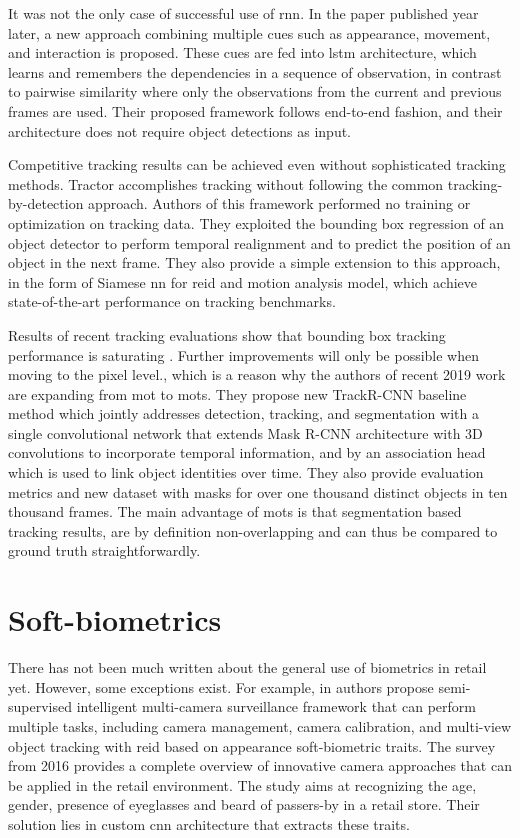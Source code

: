     It was not the only case of successful use of \gls{rnn}. In the paper \cite{sadeghian2017tracking} published year later, a new approach combining multiple cues such as appearance, movement, and interaction is proposed. These cues are fed into \gls{lstm} architecture, which learns and remembers the dependencies in a sequence of observation, in contrast to pairwise similarity where only the observations from the current and previous frames are used. Their proposed framework follows end-to-end fashion, and their architecture does not require object detections as input.
    
    Competitive tracking results can be achieved even without sophisticated tracking methods. Tractor \cite{DBLP:journals/corr/abs-1903-05625} accomplishes tracking without following the common tracking-by-detection approach. Authors of this framework performed no training or optimization on tracking data. They exploited the bounding box regression of an object detector to perform temporal realignment and to predict the position of an object in the next frame. They also provide a simple extension to this approach, in the form of Siamese \gls{nn} for \gls{reid} and motion analysis model, which achieve state-of-the-art performance on tracking benchmarks. 
    
    Results of recent tracking evaluations show that bounding box tracking performance is saturating \cite{mot16}. Further improvements will only be possible when moving to the pixel level., which is a reason why the authors of recent 2019 work \cite{DBLP:journals/corr/abs-1902-03604} are expanding from \gls{mot} to \gls{mots}. They propose new TrackR-CNN baseline method which jointly addresses detection, tracking, and segmentation with a single convolutional network that extends Mask R-CNN architecture with 3D convolutions to incorporate temporal information, and by an association head which is used to link object identities over time. They also provide evaluation metrics and new dataset with masks for over one thousand distinct objects in ten thousand frames. The main advantage of \gls{mots} is that segmentation based tracking results, are by definition non-overlapping and can thus be compared to ground truth straightforwardly.
    
\section{Soft-biometrics}
    There has not been much written about the general use of biometrics in retail yet. However, some exceptions exist. For example, in \cite{fookes2010semi} authors propose semi-supervised intelligent multi-camera surveillance framework that can perform multiple tasks, including camera management, camera calibration, and multi-view object tracking with \gls{reid} based on appearance soft-biometric traits. The survey \cite{quintana2016improving} from 2016 provides a complete overview of innovative camera approaches that can be applied in the retail environment. The study \cite{de2018comparative} aims at recognizing the age, gender, presence of eyeglasses and beard of passers-by in a retail store. Their solution lies in custom \gls{cnn} architecture that extracts these traits.
    
